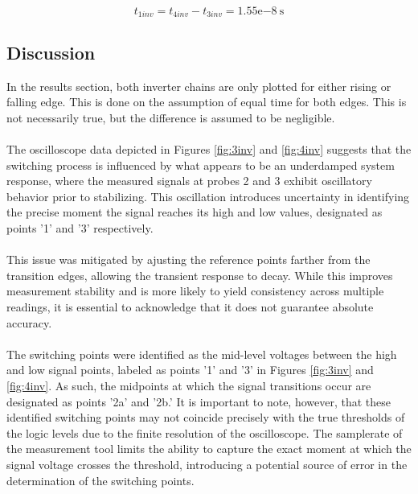 \documentclass[onecolumn]{article}
\begin{document}
\begin{equation}
    t_{1inv} = t_{4inv} - t_{3inv} = 1.55\mathrm{e}{-8} \ \text{s}
\end{equation}

\subsection{Discussion}
In the results section, both inverter chains are only plotted for either rising or falling edge. This is done on the assumption of equal time for both edges. This is not necessarily true, but the difference is assumed to be negligible.
 \paragraph*{}
The oscilloscope data depicted in Figures \ref{fig:3inv} and \ref{fig:4inv} suggests that the switching process is influenced by what appears to be an underdamped system response, where the measured signals at probes 2 and 3 exhibit oscillatory behavior prior to stabilizing. This oscillation introduces uncertainty in identifying the precise moment the signal reaches its high and low values, designated as points '1' and '3' respectively.
\paragraph*{}
This issue was mitigated by ajusting the reference points farther from the transition edges, allowing the transient response to decay. While this improves measurement stability and is more likely to yield consistency across multiple readings, it is essential to acknowledge that it does not guarantee absolute accuracy.

\paragraph*{}
The switching points were identified as the mid-level voltages between the high and low signal points, labeled as points '1' and '3' in Figures \ref{fig:3inv} and \ref{fig:4inv}. As such, the midpoints at which the signal transitions occur are designated as points '2a' and '2b.' It is important to note, however, that these identified switching points may not coincide precisely with the true thresholds of the logic levels due to the finite resolution of the oscilloscope. The samplerate of the measurement tool limits the ability to capture the exact moment at which the signal voltage crosses the threshold, introducing a potential source of error in the determination of the switching points.
\end{document}
